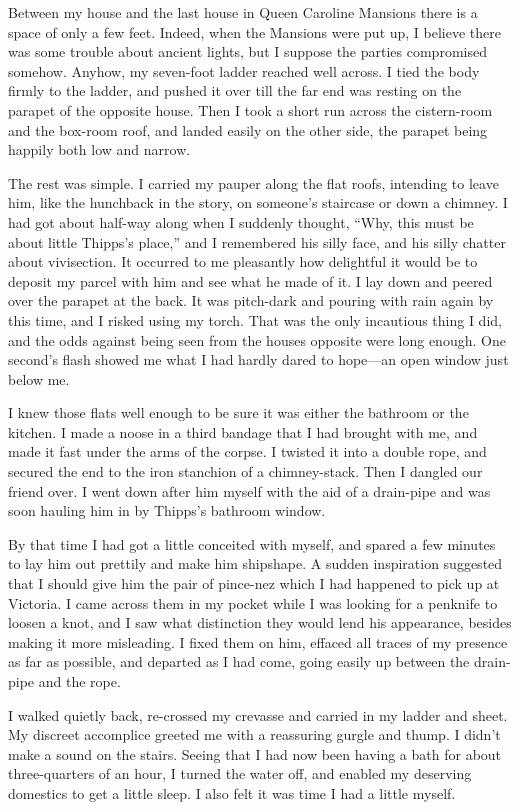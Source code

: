 Between my house and the last house in Queen Caroline Mansions there is a space of only a few feet. Indeed, when the Mansions were put up, I believe there was some trouble about ancient lights, but I suppose the parties compromised somehow. Anyhow, my seven-foot ladder reached well across. I tied the body firmly to the ladder, and pushed it over till the far end was resting on the parapet of the opposite house. Then I took a short run across the cistern-room and the box-room roof, and landed easily on the other side, the parapet being happily both low and narrow.

The rest was simple. I carried my pauper along the flat roofs, intending to leave him, like the hunchback in the story, on someone’s staircase or down a chimney. I had got about half-way along when I suddenly thought, \enquote{Why, this must be about little Thipps’s place,} and I remembered his silly face, and his silly chatter about vivisection. It occurred to me pleasantly how delightful it would be to deposit my parcel with him and see what he made of it. I lay down and peered over the parapet at the back. It was pitch-dark and pouring with rain again by this time, and I risked using my torch. That was the only incautious thing I did, and the odds against being seen from the houses opposite were long enough. One second’s flash showed me what I had hardly dared to hope\allowbreak---\allowbreak an open window just below me.

I knew those flats well enough to be sure it was either the bathroom or the kitchen. I made a noose in a third bandage that I had brought with me, and made it fast under the arms of the corpse. I twisted it into a double rope, and secured the end to the iron stanchion of a chimney-stack. Then I dangled our friend over. I went down after him myself with the aid of a drain-pipe and was soon hauling him in by Thipps’s bathroom window.

By that time I had got a little conceited with myself, and spared a few minutes to lay him out prettily and make him shipshape. A sudden inspiration suggested that I should give him the pair of pince-nez which I had happened to pick up at Victoria. I came across them in my pocket while I was looking for a penknife to loosen a knot, and I saw what distinction they would lend his appearance, besides making it more misleading. I fixed them on him, effaced all traces of my presence as far as possible, and departed as I had come, going easily up between the drain-pipe and the rope.

I walked quietly back, re-crossed my crevasse and carried in my ladder and sheet. My discreet accomplice greeted me with a reassuring gurgle and thump. I didn’t make a sound on the stairs. Seeing that I had now been having a bath for about three-quarters of an hour, I turned the water off, and enabled my deserving domestics to get a little sleep. I also felt it was time I had a little myself.

